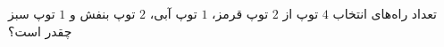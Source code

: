 \p
تعداد راه‌های انتخاب 
$4$
توپ از 
$2$
توپ قرمز، 
$1$
توپ آبی، 
$2$
توپ بنفش و 
$1$
توپ سبز چقدر است؟